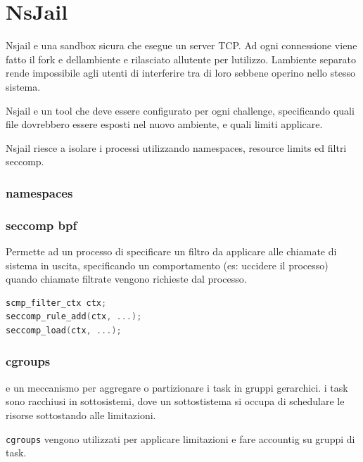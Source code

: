 \section{NsJail}\label{nsjail}

Nsjail e\textquotesingle{} una sandbox sicura che esegue un server TCP.
Ad ogni connessione viene fatto il fork e dell\textquotesingle ambiente
e rilasciato all\textquotesingle utente per l\textquotesingle utilizzo.
L\textquotesingle ambiente separato rende impossibile agli utenti di
interferire tra di loro sebbene operino nello stesso sistema.

Nsjail e\textquotesingle{} un tool che deve essere configurato per ogni
challenge, specificando quali file dovrebbero essere esposti nel nuovo
ambiente, e quali limiti applicare.

Nsjail riesce a isolare i processi utilizzando namespaces, resource
limits ed filtri seccomp.

\subsubsection{namespaces}\label{namespaces}

\subsubsection{seccomp bpf}\label{seccomp-bpf}

Permette ad un processo di specificare un filtro da applicare alle
chiamate di sistema in uscita, specificando un comportamento (es:
uccidere il processo) quando chiamate filtrate vengono richieste dal
processo.

\begin{lstlisting}[language=C]
scmp_filter_ctx ctx;
seccomp_rule_add(ctx, ...);
seccomp_load(ctx, ...);
\end{lstlisting}

\subsubsection{cgroups}\label{cgroups}

e\textquotesingle{} un meccanismo per aggregare o partizionare i task in
gruppi gerarchici. i task sono racchiusi in sottosistemi, dove un
sottostistema si occupa di schedulare le risorse sottostando alle
limitazioni.

\passthrough{\lstinline!cgroups!} vengono utilizzati per applicare
limitazioni e fare accountig su gruppi di task.
